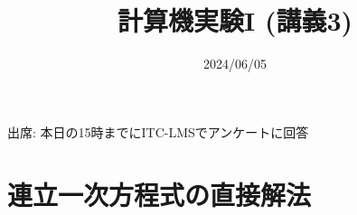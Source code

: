 \documentclass[10pt,dvipdfmx]{beamer}
\title{計算機実験I (講義3)}
\date{2024/06/05}
\begin{document}
\begin{frame}
  \titlepage
  \tableofcontents
  出席: 本日の15時までにITC-LMSでアンケートに回答
\end{frame}





\section{連立一次方程式の直接解法}







%
%
%
%


%





















\section{}

\end{document}
